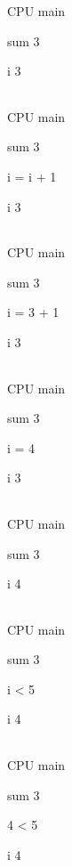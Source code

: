 \documentclass[
]{article}
\begin{document}
CPU main

sum 3

i 3

\begin{longtable}[]{@{}@{}}
\toprule
\endhead
\bottomrule
\end{longtable}

CPU main

sum 3

i = i + 1

i 3

\begin{longtable}[]{@{}@{}}
\toprule
\endhead
\bottomrule
\end{longtable}

CPU main

sum 3

i = 3 + 1

i 3

\begin{longtable}[]{@{}@{}}
\toprule
\endhead
\bottomrule
\end{longtable}

CPU main

sum 3

i = 4

i 3

\begin{longtable}[]{@{}@{}}
\toprule
\endhead
\bottomrule
\end{longtable}

CPU main

sum 3

i 4

\begin{longtable}[]{@{}@{}}
\toprule
\endhead
\bottomrule
\end{longtable}

CPU main

sum 3

i \textless{} 5

i 4

\begin{longtable}[]{@{}@{}}
\toprule
\endhead
\bottomrule
\end{longtable}

CPU main

sum 3

4 \textless{} 5

i 4

\begin{longtable}[]{@{}@{}}
\toprule
\endhead
\bottomrule
\end{longtable}
\end{document}
